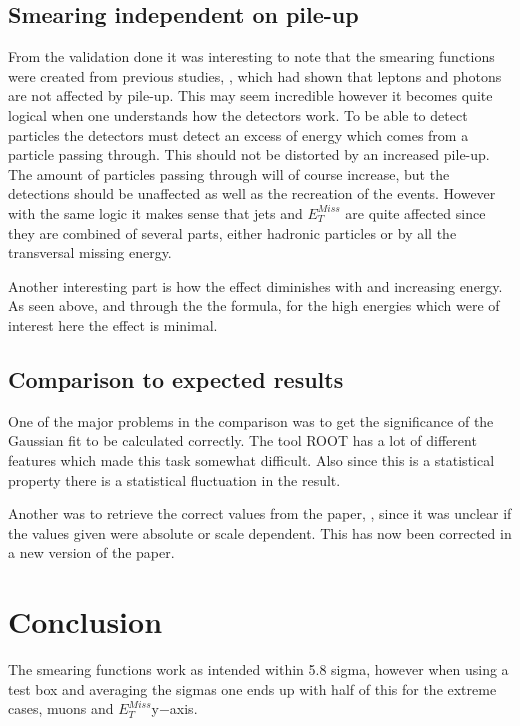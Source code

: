 \subsection{Smearing independent on pile-up}
From the validation done it was interesting to note that the smearing functions were created from previous studies, \citep{Electronperf:2011, ATLAS:LOI2}, which had shown that leptons and photons are not affected by pile-up.
This may seem incredible however it becomes quite logical when one understands how the detectors work. To be able to detect particles the detectors must detect an excess of energy which comes from a particle passing through. This should not be distorted by an increased pile-up. The amount of particles passing through will of course increase, but the detections should be unaffected as well as the recreation of the events. However with the same logic it makes sense that jets and $E_T^{Miss}$ are quite affected since they are combined of several parts, either hadronic particles or by all the transversal missing energy. 

Another interesting part is how the effect diminishes with and increasing energy. As seen above, and through the the formula, for the high energies which were of interest here the effect is minimal. 
\subsection{Comparison to expected results}
One of the major problems in the comparison was to get the significance of the Gaussian fit to be calculated correctly. The tool ROOT has a lot of different features which made this task somewhat difficult. Also since this is a statistical property there is a statistical fluctuation in the result. 

Another was to retrieve the correct values from the paper, \citep{ATL-PHYS-PUB-2013-004}, since it was unclear if the values given were absolute or scale dependent. This has now been corrected in a new version of the paper.
\newpage
\section{Conclusion}
The smearing functions work as intended within 5.8 sigma, however when using a test box and averaging the sigmas one ends up with half of this for the extreme cases, muons and $E_T^{Miss} $y$-$axis.